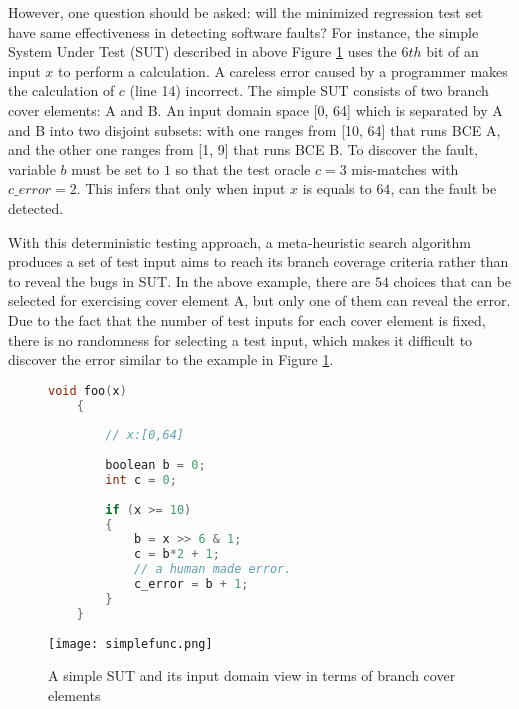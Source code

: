 \documentclass[journal]{IEEEtran}
\begin{document}
However, one question should be asked: will the minimized regression test set have same effectiveness in detecting software faults? For instance, the simple System Under Test (SUT) described in above Figure \ref{fig:SimpleSUT} uses the \(6th\) bit of an input \(x\) to perform a calculation. A careless error caused by a programmer makes the calculation of \(c\) (line 14) incorrect. The simple SUT consists of two branch cover elements: A and B. An input domain space [0, 64] which is separated by A and B into two disjoint subsets: with one ranges from [10, 64] that runs BCE A, and the other one ranges from [1, 9] that runs BCE B. To discover the fault, variable \(b\) must be set to \(1\) so that the test oracle \(c = 3\) mis-matches with \(c\_error = 2\). This infers that only when input \(x\) is equals to \(64\), can the fault be detected.

With this deterministic testing approach, a meta-heuristic search algorithm produces a set of test input aims to reach its branch coverage criteria rather than to reveal the bugs in SUT. In the above example, there are \(54\) choices that can be selected for exercising cover element A, but only one of them can reveal the error. Due to the fact that the number of test inputs for each cover element is fixed, there is no randomness for selecting a test input, which makes it difficult to discover the error similar to the example in Figure \ref{fig:SimpleSUT}.

\begin{figure}
\begin{minipage}{.55\textwidth}
	\begin{lstlisting}[language=c,linewidth=3.8cm, xleftmargin=0.1cm]
	void foo(x)
	{
	
		// x:[0,64]
		
		boolean b = 0;
		int c = 0;
		
		if (x >= 10)
		{
			b = x >> 6 & 1;
			c = b*2 + 1;
			// a human made error. 
			c_error = b + 1; 
		}
	}
	\end{lstlisting}
\end{minipage}
\hspace{0.2cm}
\begin{minipage}{.45\textwidth}
	\texttt{[image: simplefunc.png]}
\end{minipage}
\caption{A simple SUT and its input domain view in terms of branch cover elements}
\label{fig:SimpleSUT}
\end{figure}
\end{document}
